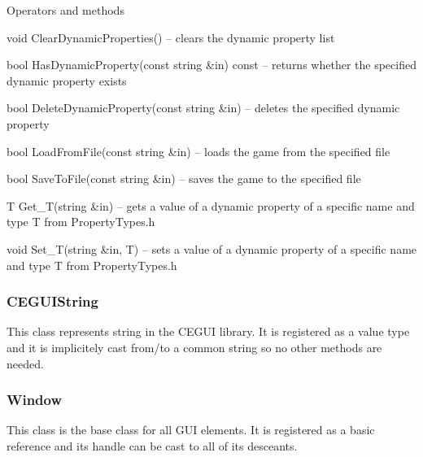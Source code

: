 \begin{titled-itemize}{Operators and methods}
  \item void ClearDynamicProperties() -- clears the dynamic property list
  \item bool HasDynamicProperty(const string \&in) const -- returns whether the specified dynamic property exists
  \item bool DeleteDynamicProperty(const string \&in) -- deletes the specified dynamic property
  \item bool LoadFromFile(const string \&in) -- loads the game from the specified file
  \item bool SaveToFile(const string \&in) -- saves the game to the specified file
  \item T Get\_T(string \&in) -- gets a value of a dynamic property of a specific name and type T from PropertyTypes.h
  \item void Set\_T(string \&in, T) -- sets a value of a dynamic property of a specific name and type T from PropertyTypes.h
\end{titled-itemize}

\subsubsection{CEGUIString}

This class represents string in the CEGUI library. It is registered as a value type and it is implicitely cast from/to a common string so no other methods are needed.

\subsubsection{Window}

This class is the base class for all GUI elements. It is registered as a basic reference and its handle can be cast to all of its desceants.

